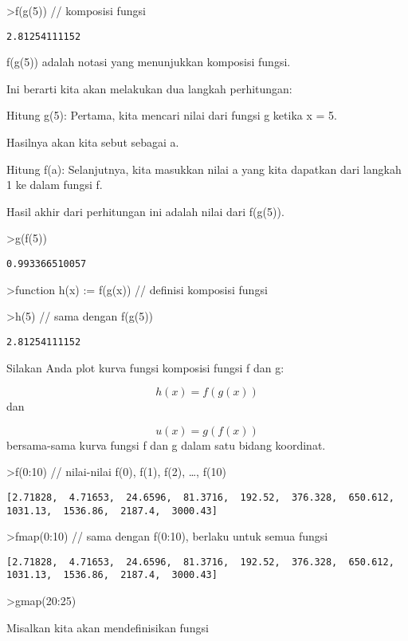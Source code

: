 \documentclass[
]{book}
\begin{document}
\textgreater f(g(5)) // komposisi fungsi

\begin{verbatim}
2.81254111152
\end{verbatim}

f(g(5)) adalah notasi yang menunjukkan komposisi fungsi.

Ini berarti kita akan melakukan dua langkah perhitungan:

Hitung g(5): Pertama, kita mencari nilai dari fungsi g ketika x = 5.

Hasilnya akan kita sebut sebagai a.

Hitung f(a): Selanjutnya, kita masukkan nilai a yang kita dapatkan dari langkah 1 ke dalam fungsi f.

Hasil akhir dari perhitungan ini adalah nilai dari f(g(5)).

\textgreater g(f(5))

\begin{verbatim}
0.993366510057
\end{verbatim}

\textgreater function h(x) := f(g(x)) // definisi komposisi fungsi

\textgreater h(5) // sama dengan f(g(5))

\begin{verbatim}
2.81254111152
\end{verbatim}

Silakan Anda plot kurva fungsi komposisi fungsi f dan g:

\[h(x)=f(g(x))\]dan

\[u(x)=g(f(x))\]bersama-sama kurva fungsi f dan g dalam satu bidang koordinat.

\textgreater f(0:10) // nilai-nilai f(0), f(1), f(2), \ldots, f(10)

\begin{verbatim}
[2.71828,  4.71653,  24.6596,  81.3716,  192.52,  376.328,  650.612,
1031.13,  1536.86,  2187.4,  3000.43]
\end{verbatim}

\textgreater fmap(0:10) // sama dengan f(0:10), berlaku untuk semua fungsi

\begin{verbatim}
[2.71828,  4.71653,  24.6596,  81.3716,  192.52,  376.328,  650.612,
1031.13,  1536.86,  2187.4,  3000.43]
\end{verbatim}

\textgreater gmap(20:25)

Misalkan kita akan mendefinisikan fungsi
\end{document}

